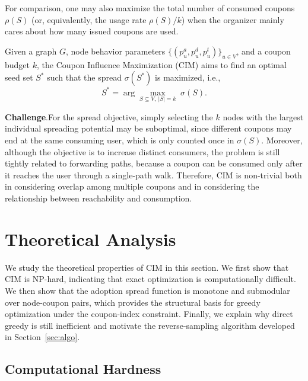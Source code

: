\documentclass[sigconf]{acmart}
\begin{document}
\textcolor[rgb]{1.00,0.00,0.00}{For comparison, one may also maximize the total number of consumed coupons $\rho(S)$ (or, equivalently, the usage rate $\rho(S)/k$) when the organizer mainly cares about how many issued coupons are used.}



\begin{definition}
\label{def:cim}
Given a graph $G$, node behavior parameters $\{(p_u^a,p_u^d,p_u^t)\}_{u\in V}$, and a coupon budget $k$, the Coupon Influence Maximization (CIM) aims to find an optimal seed set $S^*$ such that the spread $\sigma(S^*)$ is maximized, i.e.,
\begin{equation}
S^{*} = \arg\max_{S \subseteq V,\ |S|=k}\; \sigma(S).
\end{equation}
\end{definition}
\textbf{Challenge}.For the spread objective, simply selecting the $k$ nodes with the largest individual spreading potential may be suboptimal, since different coupons may end at the same consuming user, which is only counted once in $\sigma(S)$. Moreover, although the objective is to increase distinct consumers, the problem is still tightly related to forwarding paths, because a coupon can be consumed only after it reaches the user through a single-path walk. Therefore, CIM is non-trivial both in considering overlap among multiple coupons and in considering the relationship between reachability and consumption.



\section{Theoretical Analysis}
\label{sec:theory}

We study the theoretical properties of CIM in this section.
We first show that CIM is NP-hard, indicating that exact optimization
is computationally difficult.
We then show that the adoption spread function is monotone and
submodular over node-coupon pairs, which provides the structural basis
for greedy optimization under the coupon-index constraint.
Finally, we explain why direct greedy is still inefficient and motivate
the reverse-sampling algorithm developed in Section~\ref{sec:algo}.

\subsection{Computational Hardness}
\end{document}
